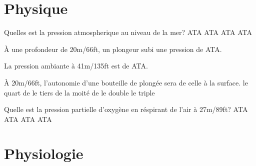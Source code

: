 \documentclass[english,12pt,a4paper]{article}
\begin{document}
	\pagebreak

\section{Physique}
	\begin{outline}
		\1 Quelles est la pression atmospherique au niveau de la mer?
			 ATA
			 ATA
			 ATA
			 ATA

		\1 À une profondeur de 20m/66ft, un plongeur subi une pression de \underline{\hspace{1.5cm}} ATA.

		\1 La pression ambiante à 41m/135ft est de \underline{\hspace{1.5cm}} ATA.

		\1 À 20m/66ft, l'autonomie d'une bouteille de plongée sera \underline{\hspace{1.5cm}} de celle à la surface.
			\2 le quart de
			\2 le tiers de
			\2 la moité de
			\2 le double
			\2 le triple

		\1 Quelle est la pression partielle d'oxygène en réspirant de l'air à 27m/89ft?
			 ATA
			 ATA
			 ATA
			 ATA
	\end{outline}
	\pagebreak

	\section{Physiologie}
\end{document}
